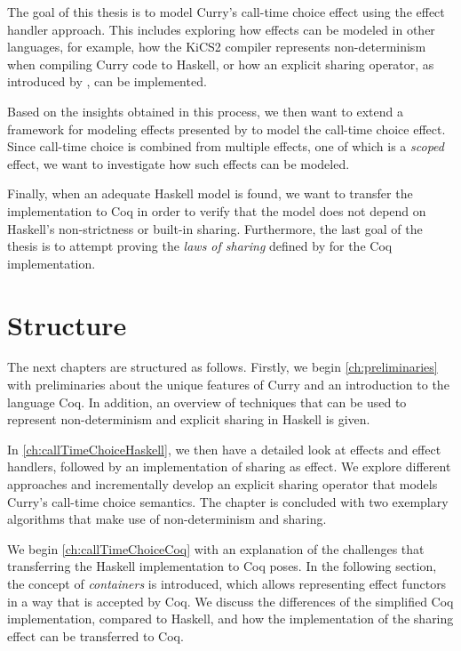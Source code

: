 \documentclass[a4paper, 11pt, fleqn, twoside, abstract=on]{scrreprt}
\begin{document}
The goal of this thesis is to model Curry's call-time choice effect using the effect handler approach.
This includes exploring how effects can be modeled in other languages, for example, how the KiCS2 compiler represents non-determinism when compiling Curry code to Haskell, or how an explicit sharing operator, as introduced by \citet{fischer2009purely}, can be implemented.

Based on the insights obtained in this process, we then want to extend a framework for modeling effects presented by \citet{wu2014effect} to model the call-time choice effect.
Since call-time choice is combined from multiple effects, one of which is a \textit{scoped} effect, we want to investigate how such effects can be modeled.

Finally, when an adequate Haskell model is found, we want to transfer the implementation to Coq in order to verify that the model does not depend on Haskell's non-strictness or built-in sharing.
Furthermore, the last goal of the thesis is to attempt proving the \textit{laws of sharing} defined by \citet{fischer2009purely} for the Coq implementation.

\section{Structure}

The next chapters are structured as follows.
Firstly, we begin \autoref{ch:preliminaries} with preliminaries about the unique features of Curry and an introduction to the language Coq.
In addition, an overview of techniques that can be used to represent non-determinism and explicit sharing in Haskell is given.

In \autoref{ch:callTimeChoiceHaskell}, we then have a detailed look at effects and effect handlers, followed by an implementation of sharing as effect.
We explore different approaches and incrementally develop an explicit sharing operator that models Curry's call-time choice semantics.
The chapter is concluded with two exemplary algorithms that make use of non-determinism and sharing.

We begin \autoref{ch:callTimeChoiceCoq} with an explanation of the challenges that transferring the Haskell implementation to Coq poses.
In the following section, the concept of \textit{containers} is introduced, which allows representing effect functors in a way that is accepted by Coq.
We discuss the differences of the simplified Coq implementation, compared to Haskell, and how the implementation of the sharing effect can be transferred to Coq.
\end{document}
